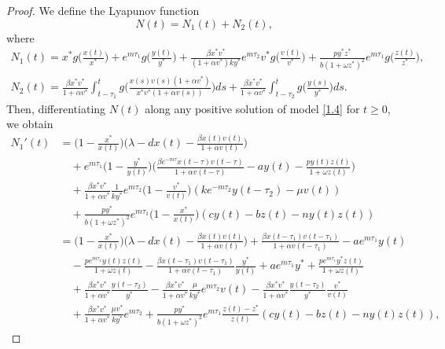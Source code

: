 \documentclass[10pt,a4paper]{amsart}
\numberwithin{equation}{section}
\begin{document}
\begin{proof}
We define the Lyapunov function 
$$
N(t)=N_{1}(t)+N_{2}(t),
$$
where
\begin{gather*}
N_{1}(t)=x^{*} g\Big(\frac{x(t)}{x^{*}}\Big)
 +e^{m\tau_1}g\Big(\frac{y(t)}{y^{*}}\Big)+\frac{\beta x^{*}v^{*}}{(1+\alpha v^{*})ky^{*}}e^{m\tau_2}v^{*}
g\Big(\frac{v(t)}{v^{*}}\Big)+\frac{py^{*}z^{*}}{b(1+\omega z^{*})^{2}}
e^{m\tau_1}g\Big(\frac{z(t)}{z^{*}}\Big), \\
N_{2}(t)=\frac{\beta x^{*}v^{*}}{1+\alpha v^{*}}\int _{t-\tau_{1}}^{t}
 g\Big(\frac{x(s)v(s)(1+\alpha v^{*})}{x^{*}v^{*}(1+\alpha v(s))}\Big)ds
+\frac{\beta x^{*}v^{*}}{1+\alpha v^{*}}\int _{t-\tau_{2}}^{t}
 g\Big(\frac{y(s)}{y^{*}}\Big)ds.
\end{gather*}
Then, differentiating $N(t)$ along any positive solution of model \eqref{1.4} 
for $t\geq 0$, we obtain
\begin{align*}
N_{1}'(t)
&= \Big(1-\frac{x^{*}}{x(t)}\Big)\Big(\lambda-dx(t)
 -{\frac{\beta x(t)v(t)}{1+\alpha v(t)}}\Big)\\
&\quad +e^{m\tau_1}\Big(1-\frac{y^{*}}{y(t)}\Big)
 \Big({\frac{\beta e^{-m\tau}x(t-\tau)v(t-\tau)}{1+\alpha v(t-\tau)}}-ay(t)
 -{\frac{py(t)z(t)}{1+\omega z(t)}}\Big)\\
&\quad +\frac{\beta x^{*}v^{*}}{1+\alpha v^{*}}\frac{1}{ky^{*}}e^{m\tau_2}
 \Big(1-\frac{v^{*}}{v(t)}\Big)(ke^{-m\tau_2}y(t-\tau_2)-\mu v(t))\\
&\quad +\frac{py^{*}}{b(1+\omega z^{*})^{2}}e^{m\tau_1}
 \Big(1-\frac{x^{*}}{x(t)}\Big)(cy(t)-bz(t)-ny(t)z(t))\\
&= \Big(1-\frac{x^{*}}{x(t)}\Big)
 \Big(\lambda-dx(t)-{\frac{\beta x(t)v(t)}{1+\alpha v(t)}}\Big)
 +\frac{\beta x(t-\tau_{1})v(t-\tau_{1})}{1+\alpha v(t-\tau_{1})}-ae^{m\tau_1}y(t) \\
&\quad -\frac{pe^{m\tau_{1}} y(t)z(t)}{1+\omega z(t)}
 -\frac{\beta x(t-\tau_{1})v(t-\tau_{1})}{1+\alpha v(t-\tau_{1})}\frac{y^{*}}{y(t)}
 +ae^{m\tau_1}y^{*}+\frac{pe^{m\tau_{1}} y^{*}z(t)}{1+\omega z(t)}\\
&\quad +\frac{\beta x^{*}v^{*}}{1+\alpha v^{*}}\frac{y(t-\tau_{2})}{y^{*}}
 -\frac{\beta x^{*}v^{*}}{1+\alpha v^{*}}\frac{\mu}{ky^{*}}e^{m\tau_2}v(t)
 -\frac{\beta x^{*}v^{*}}{1+\alpha v^{*}}\frac{y(t-\tau_{2})}{y^{*}}\frac{v^{*}}{v(t)}\\
&\quad +\frac{\beta x^{*}v^{*}}{1+\alpha v^{*}}\frac{\mu v^{*}}{ky^{*}}e^{m\tau_2}
 +\frac{py^{*}}{b(1+\omega z^{*})^{2}}e^{m\tau_1}\frac{z(t)-z^{*}}{z(t)}(cy(t)
 -bz(t)-ny(t)z(t)),
\end{align*}

\end{proof}
\end{document}
